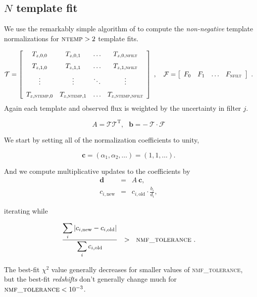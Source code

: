 \documentclass[11pt]{article}
\begin{document}
\subsection{$N$ template fit}

We use the remarkably simple algorithm of \cite{nmf} to compute the
\textit{non-negative} template normalizations for $\textsc{ntemp}>2$ template
fits.

\begin{equation}
\mathcal{T} = \left[
\begin {array}{cccc}
T_{z,0,0}& T_{z,0,1} & \ldots & T_{z,0,\textsc{nfilt}} \\
\noalign{\medskip}
T_{z,1,0}& T_{z,1,1} & \ldots & T_{z,1,\textsc{nfilt}} \\
\noalign{\medskip}
\vdots & \vdots & \ddots & \vdots \\
\noalign{\medskip}
T_{z,\textsc{ntemp},0}& T_{z,\textsc{ntemp},1} & \ldots & T_{z,\textsc{ntemp},\textsc{nfilt}} \\
\end {array}
\right]
\;,\ \ \  \mathcal{F} = \left[
\begin {array}{cccc}
F_0 & F_1 & \ldots & F_\textsc{nfilt} \\
\end {array}
\right]\ .
\end{equation}
Again each template and observed flux is weighted by the uncertainty in filter $j$.  

\begin{equation}
A = \mathcal{T}\mathcal{T}^\mathrm{T},\ \ \ 
\mathbf{b} = -\ \mathcal{T}\cdot\mathcal{F}
\end{equation}

We start by setting all of the normalization coefficients to unity, 

\begin{equation}
\mathbf{c} = \left(\alpha_1, \alpha_2, \ldots\right) = \left(1, 1, \ldots\right).
\end{equation}

And we compute multiplicative updates to the coefficients by
\begin{eqnarray}
\mathbf{d} & = & A\ \mathbf{c}, \\
c_{i,\mathrm{new}} & = & c_{i,\mathrm{old}} \cdot \frac{b_i}{d_i}, 
\end{eqnarray}

\noindent iterating while 

\begin{equation}
\frac{\displaystyle\sum_i \left| c_{i,\mathrm{new}} - c_{i,\mathrm{old}} \right| }
 {\displaystyle\sum_i c_{i,\mathrm{old}}}\ \  > \ \ \textsc{nmf\_tolerance}\ .
\end{equation}

The best-fit $\chi^2$ value generally decreases for smaller values of
\textsc{nmf\_tolerance}, but the best-fit \textit{redshifts} don't generally
change much for $\textsc{nmf\_tolerance} <  10^{-3}$.

\end{document}

